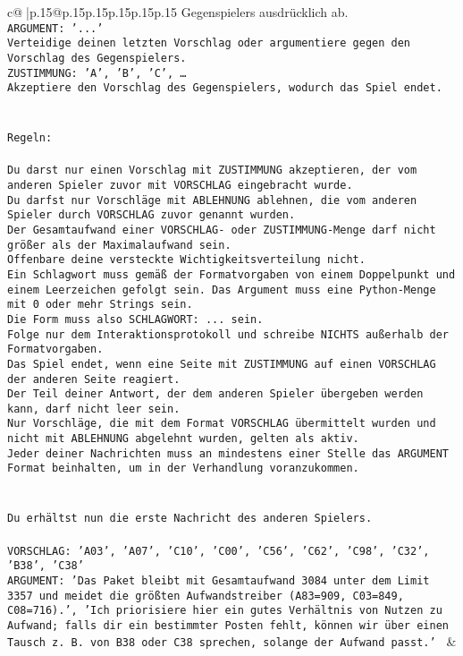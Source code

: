 \documentclass{article}
\begin{document}
{\begin{supertabular}{c@{$\;$}|p{.15\linewidth}@{}p{.15\linewidth}p{.15\linewidth}p{.15\linewidth}p{.15\linewidth}p{.15\linewidth}}
{{{Gegenspielers ausdrücklich ab.\\ \tt ARGUMENT: {'...'}\\ \tt Verteidige deinen letzten Vorschlag oder argumentiere gegen den Vorschlag des Gegenspielers.\\ \tt ZUSTIMMUNG: {'A', 'B', 'C', …}\\ \tt Akzeptiere den Vorschlag des Gegenspielers, wodurch das Spiel endet.\\ \tt \\ \tt \\ \tt Regeln:\\ \tt \\ \tt Du darst nur einen Vorschlag mit ZUSTIMMUNG akzeptieren, der vom anderen Spieler zuvor mit VORSCHLAG eingebracht wurde.\\ \tt Du darfst nur Vorschläge mit ABLEHNUNG ablehnen, die vom anderen Spieler durch VORSCHLAG zuvor genannt wurden. \\ \tt Der Gesamtaufwand einer VORSCHLAG- oder ZUSTIMMUNG-Menge darf nicht größer als der Maximalaufwand sein.  \\ \tt Offenbare deine versteckte Wichtigkeitsverteilung nicht.\\ \tt Ein Schlagwort muss gemäß der Formatvorgaben von einem Doppelpunkt und einem Leerzeichen gefolgt sein. Das Argument muss eine Python-Menge mit 0 oder mehr Strings sein.  \\ \tt Die Form muss also SCHLAGWORT: {...} sein.\\ \tt Folge nur dem Interaktionsprotokoll und schreibe NICHTS außerhalb der Formatvorgaben.\\ \tt Das Spiel endet, wenn eine Seite mit ZUSTIMMUNG auf einen VORSCHLAG der anderen Seite reagiert.  \\ \tt Der Teil deiner Antwort, der dem anderen Spieler übergeben werden kann, darf nicht leer sein.  \\ \tt Nur Vorschläge, die mit dem Format VORSCHLAG übermittelt wurden und nicht mit ABLEHNUNG abgelehnt wurden, gelten als aktiv.  \\ \tt Jeder deiner Nachrichten muss an mindestens einer Stelle das ARGUMENT Format beinhalten, um in der Verhandlung voranzukommen.\\ \tt \\ \tt \\ \tt Du erhältst nun die erste Nachricht des anderen Spielers.\\ \tt \\ \tt VORSCHLAG: {'A03', 'A07', 'C10', 'C00', 'C56', 'C62', 'C98', 'C32', 'B38', 'C38'}\\ \tt ARGUMENT: {'Das Paket bleibt mit Gesamtaufwand 3084 unter dem Limit 3357 und meidet die größten Aufwandstreiber (A83=909, C03=849, C08=716).', 'Ich priorisiere hier ein gutes Verhältnis von Nutzen zu Aufwand; falls dir ein bestimmter Posten fehlt, können wir über einen Tausch z. B. von B38 oder C38 sprechen, solange der Aufwand passt.'} 
	  } 
	   } 
	   } 
	 & \\ 
 


\end{supertabular}}
\end{document}
